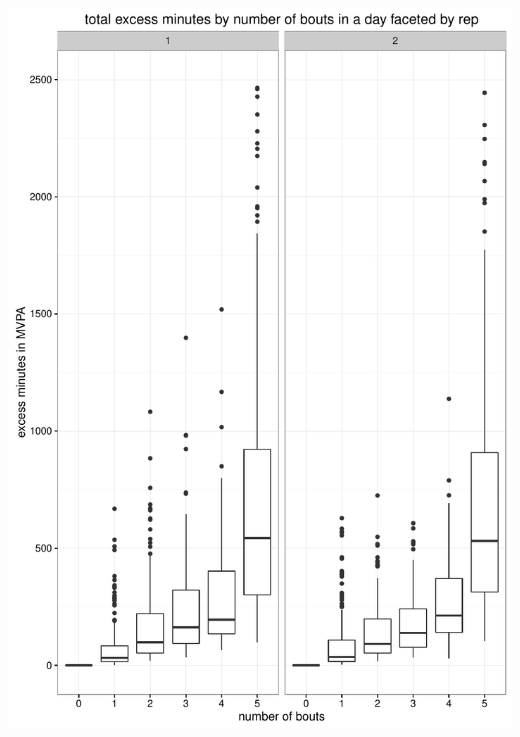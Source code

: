 \documentclass[11pt]{article}\usepackage[]{graphicx}\usepackage[]{color}
\makeatletter
\def\maxwidth{ %
  \ifdim\Gin@nat@width>\linewidth
    \linewidth
  \else
    \Gin@nat@width
  \fi
}
\newenvironment{knitrout}{}{} %
\makeatother
\begin{document}
\begin{knitrout}
\color{fgcolor}
\includegraphics[width=\maxwidth]{figure/p2bb-1} 

\end{knitrout}
\end{document}
